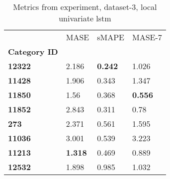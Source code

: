 \begin{table}[H]
\centering
\caption{Metrics from experiment, dataset-3, local univariate lstm}
\label{table:local-univariate-lstm-dataset-3}
\begin{tabular}{llll}
\toprule
{} &            MASE &           sMAPE &          MASE-7 \\
\textbf{Category ID} &                 &                 &                 \\
\midrule
\textbf{12322      } &           2.186 &  \textbf{0.242} &           1.026 \\
\textbf{11428      } &           1.906 &           0.343 &           1.347 \\
\textbf{11850      } &            1.56 &           0.368 &  \textbf{0.556} \\
\textbf{11852      } &           2.843 &           0.311 &            0.78 \\
\textbf{273        } &           2.371 &           0.561 &           1.595 \\
\textbf{11036      } &           3.001 &           0.539 &           3.223 \\
\textbf{11213      } &  \textbf{1.318} &           0.469 &           0.889 \\
\textbf{12532      } &           1.898 &           0.985 &           1.032 \\
\bottomrule
\end{tabular}
\end{table}
